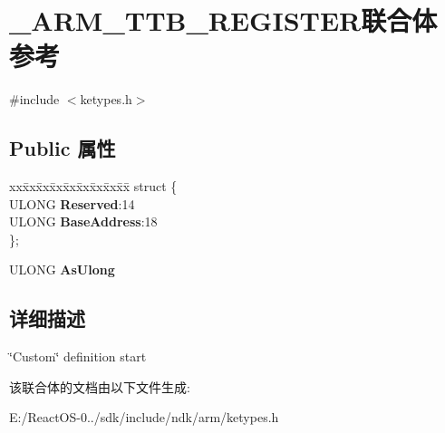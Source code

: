 \hypertarget{union___a_r_m___t_t_b___r_e_g_i_s_t_e_r}{}\section{\+\_\+\+A\+R\+M\+\_\+\+T\+T\+B\+\_\+\+R\+E\+G\+I\+S\+T\+E\+R联合体 参考}
\label{union___a_r_m___t_t_b___r_e_g_i_s_t_e_r}


{\ttfamily \#include $<$ketypes.\+h$>$}

\subsection*{Public 属性}
\begin{DoxyCompactItemize}
\item 
\mbox{\label{union___a_r_m___t_t_b___r_e_g_i_s_t_e_r_a01268580de820d97a18b7275b02fe22a}} 
\begin{tabbing}
xx\=xx\=xx\=xx\=xx\=xx\=xx\=xx\=xx\=\kill
struct \{\\
\>ULONG {\bfseries Reserved}:14\\
\>ULONG {\bfseries BaseAddress}:18\\
\}; \\

\end{tabbing}\item 
\mbox{\label{union___a_r_m___t_t_b___r_e_g_i_s_t_e_r_a2a4daeb01a0e8330b061b741e9a01b74}} 
U\+L\+O\+NG {\bfseries As\+Ulong}
\end{DoxyCompactItemize}


\subsection{详细描述}
\char`\"{}\+Custom\char`\"{} definition start 

该联合体的文档由以下文件生成\+:\begin{DoxyCompactItemize}
\item 
E\+:/\+React\+O\+S-\/0../sdk/include/ndk/arm/ketypes.\+h\end{DoxyCompactItemize}
